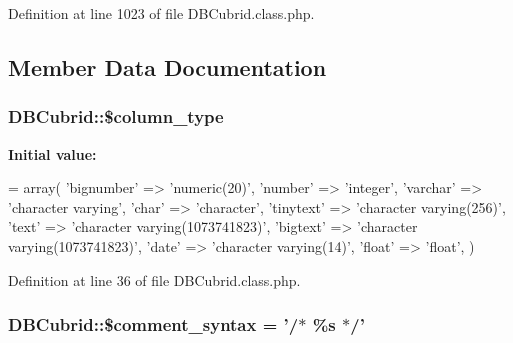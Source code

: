 Definition at line 1023 of file D\+B\+Cubrid.\+class.\+php.



\subsection{Member Data Documentation}
\hypertarget{classDBCubrid_a92995e5eed892ec4076cb3c1f5fdb2f1}{
\subsubsection[{\$column\+\_\+type}]{\setlength{\rightskip}{0pt plus 5cm}D\+B\+Cubrid\+::\$column\+\_\+type}}\label{classDBCubrid_a92995e5eed892ec4076cb3c1f5fdb2f1}
{\bfseries Initial value\+:}
\begin{DoxyCode}
= array(
        \textcolor{stringliteral}{'bignumber'} => \textcolor{stringliteral}{'numeric(20)'},
        \textcolor{stringliteral}{'number'} => \textcolor{stringliteral}{'integer'},
        \textcolor{stringliteral}{'varchar'} => \textcolor{stringliteral}{'character varying'},
        \textcolor{stringliteral}{'char'} => \textcolor{stringliteral}{'character'},
        \textcolor{stringliteral}{'tinytext'} => \textcolor{stringliteral}{'character varying(256)'},
        \textcolor{stringliteral}{'text'} => \textcolor{stringliteral}{'character varying(1073741823)'},
        \textcolor{stringliteral}{'bigtext'} => \textcolor{stringliteral}{'character varying(1073741823)'},
        \textcolor{stringliteral}{'date'} => \textcolor{stringliteral}{'character varying(14)'},
        \textcolor{stringliteral}{'float'} => \textcolor{stringliteral}{'float'},
    )
\end{DoxyCode}


Definition at line 36 of file D\+B\+Cubrid.\+class.\+php.

\hypertarget{classDBCubrid_a0060c7dcaf443efddbe4492d4479fe0b}{
\subsubsection[{\$comment\+\_\+syntax}]{\setlength{\rightskip}{0pt plus 5cm}D\+B\+Cubrid\+::\$comment\+\_\+syntax = '/$\ast$ \%s $\ast$/'}}\label{classDBCubrid_a0060c7dcaf443efddbe4492d4479fe0b}


